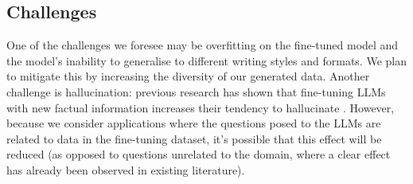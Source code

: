 \subsection{Challenges}

One of the challenges we foresee may be overfitting on the fine-tuned model and
the model's inability to generalise to different writing styles and formats. We
plan to mitigate this by increasing the diversity of our generated data. Another
challenge is hallucination: previous research has shown that fine-tuning LLMs
with new factual information increases their tendency to hallucinate
\citep{gekhman_does_2024}. However, because we consider applications where the
questions posed to the LLMs are related to data in the fine-tuning dataset, it's
possible that this effect will be reduced (as opposed to questions unrelated to
the domain, where a clear effect has already been observed in existing
literature).
